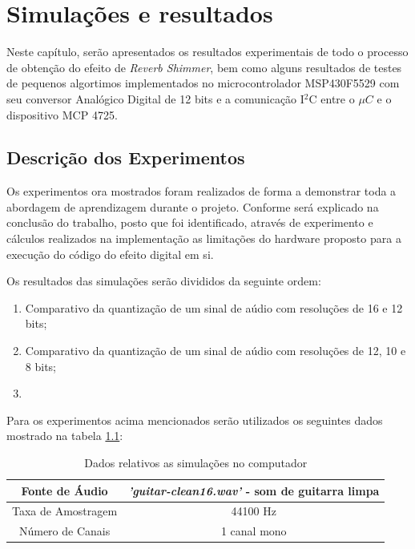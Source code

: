 \chapter{Simulações e resultados}
	Neste capítulo, serão apresentados os resultados experimentais de todo o processo de obtenção do efeito de \textit{Reverb Shimmer}, bem como alguns resultados de testes de pequenos algortimos implementados no microcontrolador MSP430F5529 com seu conversor Analógico Digital de 12 bits e a comunicação I$ ^2 $C entre o $ \mu C $ e o dispositivo MCP 4725.
	
	\section{Descrição dos Experimentos}
	
		Os experimentos ora mostrados foram realizados de forma a demonstrar toda a abordagem de aprendizagem durante o projeto. Conforme será explicado na conclusão do trabalho, posto que foi identificado, através de experimento e cálculos realizados na implementação as limitações do hardware proposto para a execução do código do efeito digital em si.


		Os resultados das simulações serão divididos da seguinte ordem:
		
		\begin{enumerate}
			\item Comparativo da quantização de um sinal de aúdio com resoluções de 16 e 12 bits;
			\item Comparativo da quantização de um sinal de aúdio com resoluções de 12, 10 e 8 bits;
			\item 
		\end{enumerate}
	
		Para os experimentos acima mencionados serão utilizados os seguintes dados mostrado na tabela \ref{tab-exp01}:
		
		\begin{table}[!ht]
			\centering
			\begin{tabular}[ht!]{|c|c|}
				\hline 
				Fonte de Áudio		&	\textit{'guitar-clean16.wav'} - som de guitarra limpa\\
				\hline
				Taxa de Amostragem 	&	44100 Hz	\\
				\hline
				Número de Canais 	&	1 canal mono\\ 
				\hline
			\end{tabular}
			\caption{Dados relativos as simulações no computador}
			\label{tab-exp01}
		\end{table}
	
